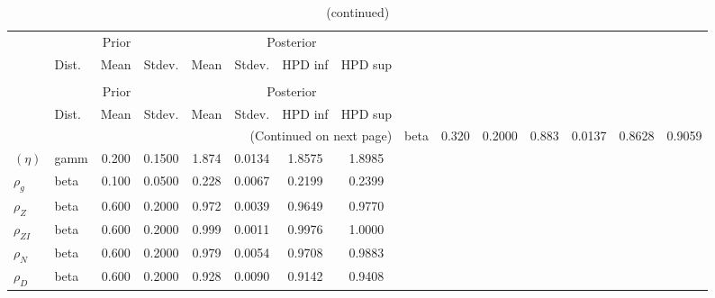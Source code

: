  
\begin{center}
\begin{longtable}{llcccccc} 
\caption{Results from Metropolis-Hastings (parameters)}
 \label{Table:MHPosterior:1}\\
\toprule 
  & \multicolumn{3}{c}{Prior}  &  \multicolumn{4}{c}{Posterior} \\
  \cmidrule(r{.75em}){2-4} \cmidrule(r{.75em}){5-8}
  & Dist. & Mean  & Stdev. & Mean & Stdev. & HPD inf & HPD sup\\
\midrule \endfirsthead 
\caption{(continued)}\\\toprule 
  & \multicolumn{3}{c}{Prior}  &  \multicolumn{4}{c}{Posterior} \\
  \cmidrule(r{.75em}){2-4} \cmidrule(r{.75em}){5-8}
  & Dist. & Mean  & Stdev. & Mean & Stdev. & HPD inf & HPD sup\\
\midrule \endhead 
\bottomrule \multicolumn{8}{r}{(Continued on next page)} \endfoot 
\bottomrule \endlastfoot 
$(\phi)$ & beta &   0.320 & 0.2000 &   0.883& 0.0137 &  0.8628 &  0.9059 \\ 
$(\eta)$ & gamm &   0.200 & 0.1500 &   1.874& 0.0134 &  1.8575 &  1.8985 \\ 
${\rho_g}$ & beta &   0.100 & 0.0500 &   0.228& 0.0067 &  0.2199 &  0.2399 \\ 
${\rho_Z}$ & beta &   0.600 & 0.2000 &   0.972& 0.0039 &  0.9649 &  0.9770 \\ 
${\rho_{ZI}}$ & beta &   0.600 & 0.2000 &   0.999& 0.0011 &  0.9976 &  1.0000 \\ 
${\rho_N}$ & beta &   0.600 & 0.2000 &   0.979& 0.0054 &  0.9708 &  0.9883 \\ 
${\rho_D}$ & beta &   0.600 & 0.2000 &   0.928& 0.0090 &  0.9142 &  0.9408 \\ 
\end{longtable}
 \end{center}
